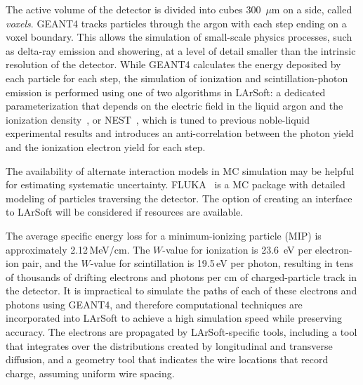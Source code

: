 The active volume of the detector is divided into cubes 300~$\mu$m on
a side, called \textit{voxels}.  GEANT4 tracks particles through the argon with
each step ending on a voxel boundary. This allows the simulation of small-scale
physics processes, such as delta-ray emission and showering, at a level
of detail smaller than the intrinsic resolution of the detector.   While GEANT4
calculates the energy deposited by each particle for each step, the
simulation of ionization and scintillation-photon emission 
is performed using one of two algorithms in LArSoft:  a dedicated parameterization that
depends on the electric field in the liquid argon and the ionization
density~\cite{Birks:1964zz}, or  NEST~\cite{Szydagis:2011tk}, which is tuned to
previous noble-liquid experimental results and introduces an
anti-correlation between the photon yield and the ionization electron
yield for each step.  

The availability of alternate interaction models in MC simulation may be helpful for estimating systematic uncertainty.
FLUKA~\cite{Fluka15, Ferrari:2005zk, Battistoni:2009zzb} is a MC package with detailed modeling of particles traversing the detector. The option of creating an interface to LArSoft will be considered if resources are available. 


The average specific energy loss for a minimum-ionizing particle (MIP)
is approximately 2.12\,MeV/cm.  The $W$-value for ionization is 23.6~eV
per electron-ion pair, and the $W$-value for scintillation is 19.5\,eV
per photon, resulting in tens of thousands of drifting electrons and
photons per cm of charged-particle track in the detector.  It is
impractical to simulate the paths of each of these electrons and 
photons using GEANT4, and therefore computational techniques are incorporated
into LArSoft to achieve a high simulation speed while preserving
accuracy.  The electrons are propagated by LArSoft-specific tools,
including a tool that integrates over the distributions created by longitudinal
and transverse diffusion, 
and a geometry tool that indicates the wire locations that record charge, assuming uniform wire spacing.

